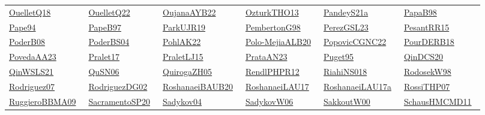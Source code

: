\begin{longtable}{*{6}{l}}
\href{works/OuelletQ18.pdf}{OuelletQ18}~\cite{OuelletQ18} & \href{works/OuelletQ22.pdf}{OuelletQ22}~\cite{OuelletQ22} & \href{works/OujanaAYB22.pdf}{OujanaAYB22}~\cite{OujanaAYB22} & \href{works/OzturkTHO13.pdf}{OzturkTHO13}~\cite{OzturkTHO13} & \href{works/PandeyS21a.pdf}{PandeyS21a}~\cite{PandeyS21a} & \href{works/PapaB98.pdf}{PapaB98}~\cite{PapaB98}\\ 
\href{}{Pape94}~\cite{Pape94} & \href{}{PapeB97}~\cite{PapeB97} & \href{works/ParkUJR19.pdf}{ParkUJR19}~\cite{ParkUJR19} & \href{works/PembertonG98.pdf}{PembertonG98}~\cite{PembertonG98} & \href{works/PerezGSL23.pdf}{PerezGSL23}~\cite{PerezGSL23} & \href{works/PesantRR15.pdf}{PesantRR15}~\cite{PesantRR15}\\ 
\href{works/PoderB08.pdf}{PoderB08}~\cite{PoderB08} & \href{works/PoderBS04.pdf}{PoderBS04}~\cite{PoderBS04} & \href{works/PohlAK22.pdf}{PohlAK22}~\cite{PohlAK22} & \href{works/Polo-MejiaALB20.pdf}{Polo-MejiaALB20}~\cite{Polo-MejiaALB20} & \href{works/PopovicCGNC22.pdf}{PopovicCGNC22}~\cite{PopovicCGNC22} & \href{works/PourDERB18.pdf}{PourDERB18}~\cite{PourDERB18}\\ 
\href{works/PovedaAA23.pdf}{PovedaAA23}~\cite{PovedaAA23} & \href{works/Pralet17.pdf}{Pralet17}~\cite{Pralet17} & \href{works/PraletLJ15.pdf}{PraletLJ15}~\cite{PraletLJ15} & \href{works/PrataAN23.pdf}{PrataAN23}~\cite{PrataAN23} & \href{works/Puget95.pdf}{Puget95}~\cite{Puget95} & \href{works/QinDCS20.pdf}{QinDCS20}~\cite{QinDCS20}\\ 
\href{works/QinWSLS21.pdf}{QinWSLS21}~\cite{QinWSLS21} & \href{works/QuSN06.pdf}{QuSN06}~\cite{QuSN06} & \href{works/QuirogaZH05.pdf}{QuirogaZH05}~\cite{QuirogaZH05} & \href{works/RendlPHPR12.pdf}{RendlPHPR12}~\cite{RendlPHPR12} & \href{works/RiahiNS018.pdf}{RiahiNS018}~\cite{RiahiNS018} & \href{works/RodosekW98.pdf}{RodosekW98}~\cite{RodosekW98}\\ 
\href{works/Rodriguez07.pdf}{Rodriguez07}~\cite{Rodriguez07} & \href{works/RodriguezDG02.pdf}{RodriguezDG02}~\cite{RodriguezDG02} & \href{}{RoshanaeiBAUB20}~\cite{RoshanaeiBAUB20} & \href{}{RoshanaeiLAU17}~\cite{RoshanaeiLAU17} & \href{}{RoshanaeiLAU17a}~\cite{RoshanaeiLAU17a} & \href{works/RossiTHP07.pdf}{RossiTHP07}~\cite{RossiTHP07}\\ 
\href{works/RuggieroBBMA09.pdf}{RuggieroBBMA09}~\cite{RuggieroBBMA09} & \href{works/SacramentoSP20.pdf}{SacramentoSP20}~\cite{SacramentoSP20} & \href{works/Sadykov04.pdf}{Sadykov04}~\cite{Sadykov04} & \href{works/SadykovW06.pdf}{SadykovW06}~\cite{SadykovW06} & \href{works/SakkoutW00.pdf}{SakkoutW00}~\cite{SakkoutW00} & \href{works/SchausHMCMD11.pdf}{SchausHMCMD11}~\cite{SchausHMCMD11}\\ 

\end{longtable}
